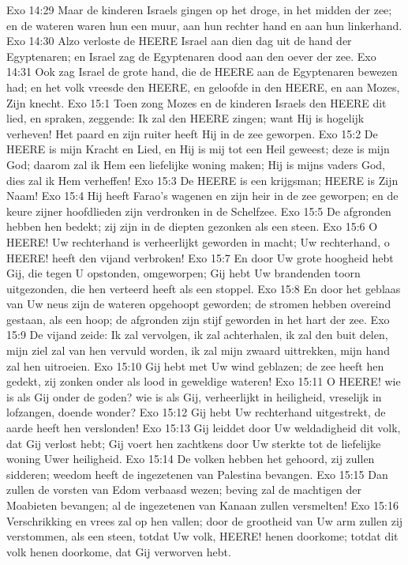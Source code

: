 Exo 14:29  Maar de kinderen Israels gingen op het droge, in het midden der zee; en de wateren waren hun een muur, aan hun rechter hand en aan hun linkerhand.
Exo 14:30  Alzo verloste de HEERE Israel aan dien dag uit de hand der Egyptenaren; en Israel zag de Egyptenaren dood aan den oever der zee.
Exo 14:31  Ook zag Israel de grote hand, die de HEERE aan de Egyptenaren bewezen had; en het volk vreesde den HEERE, en geloofde in den HEERE, en aan Mozes, Zijn knecht.
Exo 15:1  Toen zong Mozes en de kinderen Israels den HEERE dit lied, en spraken, zeggende: Ik zal den HEERE zingen; want Hij is hogelijk verheven! Het paard en zijn ruiter heeft Hij in de zee geworpen.
Exo 15:2  De HEERE is mijn Kracht en Lied, en Hij is mij tot een Heil geweest; deze is mijn God; daarom zal ik Hem een liefelijke woning maken; Hij is mijns vaders God, dies zal ik Hem verheffen!
Exo 15:3  De HEERE is een krijgsman; HEERE is Zijn Naam!
Exo 15:4  Hij heeft Farao's wagenen en zijn heir in de zee geworpen; en de keure zijner hoofdlieden zijn verdronken in de Schelfzee.
Exo 15:5  De afgronden hebben hen bedekt; zij zijn in de diepten gezonken als een steen.
Exo 15:6  O HEERE! Uw rechterhand is verheerlijkt geworden in macht; Uw rechterhand, o HEERE! heeft den vijand verbroken!
Exo 15:7  En door Uw grote hoogheid hebt Gij, die tegen U opstonden, omgeworpen; Gij hebt Uw brandenden toorn uitgezonden, die hen verteerd heeft als een stoppel.
Exo 15:8  En door het geblaas van Uw neus zijn de wateren opgehoopt geworden; de stromen hebben overeind gestaan, als een hoop; de afgronden zijn stijf geworden in het hart der zee.
Exo 15:9  De vijand zeide: Ik zal vervolgen, ik zal achterhalen, ik zal den buit delen, mijn ziel zal van hen vervuld worden, ik zal mijn zwaard uittrekken, mijn hand zal hen uitroeien.
Exo 15:10  Gij hebt met Uw wind geblazen; de zee heeft hen gedekt, zij zonken onder als lood in geweldige wateren!
Exo 15:11  O HEERE! wie is als Gij onder de goden? wie is als Gij, verheerlijkt in heiligheid, vreselijk in lofzangen, doende wonder?
Exo 15:12  Gij hebt Uw rechterhand uitgestrekt, de aarde heeft hen verslonden!
Exo 15:13  Gij leiddet door Uw weldadigheid dit volk, dat Gij verlost hebt; Gij voert hen zachtkens door Uw sterkte tot de liefelijke woning Uwer heiligheid.
Exo 15:14  De volken hebben het gehoord, zij zullen sidderen; weedom heeft de ingezetenen van Palestina bevangen.
Exo 15:15  Dan zullen de vorsten van Edom verbaasd wezen; beving zal de machtigen der Moabieten bevangen; al de ingezetenen van Kanaan zullen versmelten!
Exo 15:16  Verschrikking en vrees zal op hen vallen; door de grootheid van Uw arm zullen zij verstommen, als een steen, totdat Uw volk, HEERE! henen doorkome; totdat dit volk henen doorkome, dat Gij verworven hebt.

